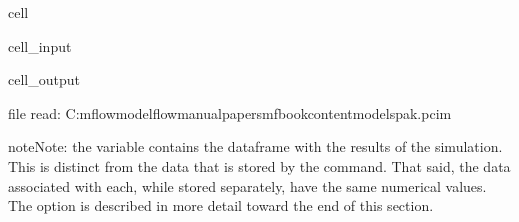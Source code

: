 \documentclass[letterpaper,10pt,english]{jupyterBook}
\begin{document}
\begin{sphinxuseclass}{cell}\begin{sphinxVerbatimInput}

\begin{sphinxuseclass}{cell_input}
\begin{sphinxVerbatim}[commandchars=\\\{\}]
   \PYGZbs{}
                                 
\end{sphinxVerbatim}

\end{sphinxuseclass}\end{sphinxVerbatimInput}
\begin{sphinxVerbatimOutput}

\begin{sphinxuseclass}{cell_output}
\begin{sphinxVerbatim}[commandchars=\\\{\}]
file read:  C:\PYGZbs{}mflow\PYGZbs{}modelflow\PYGZhy{}manual\PYGZbs{}papers\PYGZbs{}mfbook\PYGZbs{}content\PYGZbs{}models\PYGZbs{}pak.pcim
\end{sphinxVerbatim}

\end{sphinxuseclass}\end{sphinxVerbatimOutput}

\end{sphinxuseclass}
\begin{sphinxadmonition}{note}{Note:}
\sphinxAtStartPar
the variable  contains the dataframe with the results of the simulation.  This is distinct from the data that is stored by the  command. That said, the data associated with each, while stored separately, have the same numerical values. The  option is described in more detail toward the end of this section.
\end{sphinxadmonition}
\end{document}
